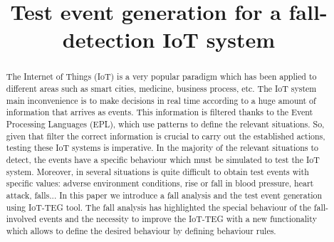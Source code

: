 \documentclass[conference]{IEEEtran}
\theoremstyle{definition}
\begin{document}
%
\title{Test event generation for a fall-detection IoT system}


\author{
\and
{}
}

\maketitle

\begin{abstract}
The Internet of Things (IoT) is a very popular paradigm which has been applied to different areas 
such as smart cities, medicine, business process, etc. The IoT system main inconvenience is to make
decisions in real time according to a huge amount of information that arrives as events. This information
is filtered thanks to the Event Processing Languages (EPL), which use patterns to define the relevant situations.
So, given that filter the correct information is crucial to carry out the established actions, testing these
IoT systems is imperative.
In the majority of the relevant situations to detect, the events have a specific behaviour which must
be simulated to test the IoT system. Moreover, in several situations is quite difficult to obtain test events with
specific values: adverse environment conditions, rise or fall in blood pressure, heart attack, falls... 
In this paper we introduce a fall analysis and the test event generation using IoT-TEG tool. The fall analysis
has highlighted the special behaviour of the fall-involved events and the necessity to improve the IoT-TEG with
a new functionality which allows to define the desired behaviour by defining behaviour rules.
\end{abstract}
\end{document}
